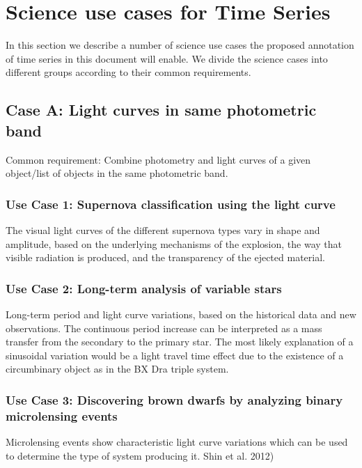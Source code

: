 \documentclass[11pt,a4paper]{ivoa} 
\begin{document}
\section{Science use cases for Time Series}
In this section we describe a number of science use cases the proposed
annotation of time series in this document will enable. We divide the
science cases into different groups according to their common
requirements.
\subsection{Case A: Light curves in same photometric band}
Common requirement: Combine photometry and light curves of a given
object/list of objects in the same photometric band.

\subsubsection{Use Case 1: Supernova classification using the light curve}
The visual light curves of the different supernova types vary in shape
and amplitude, based on the underlying mechanisms of the explosion,
the way that visible radiation is produced, and the transparency of
the ejected material.

\subsubsection{Use Case 2: Long-term analysis of variable stars}
Long-term period and light curve variations, based on the historical
data and new observations. The continuous period increase can be
interpreted as a mass transfer from the secondary to the primary
star. The most likely explanation of a sinusoidal variation would be a
light travel time effect due to the existence of a circumbinary object
as in the BX Dra triple system.

\subsubsection{Use Case 3: Discovering brown dwarfs by analyzing binary microlensing events}
Microlensing events show characteristic light curve variations which
can be used to determine the type of system producing it. %
Shin et al. 2012)

\end{document}
